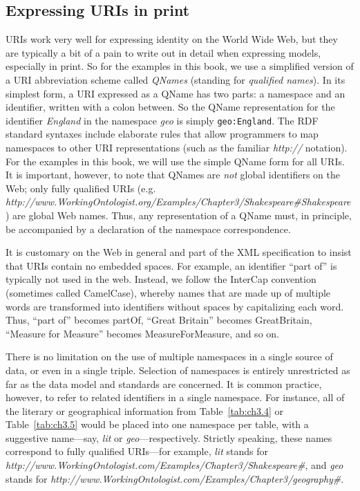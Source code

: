 \subsection{Expressing URIs in print}

URIs work very well for expressing identity on the World Wide Web, but
they are typically a bit of a pain to write out in detail when
expressing models, especially in print. So for the examples in this
book, we use a simplified version of a URI abbreviation scheme called
\emph{QNames} (standing for \emph{qualified names}). In its simplest form, a
URI expressed as a QName has two parts: a namespace and an identifier,
written with a colon between. So the QName representation for the
identifier \emph{England} in the namespace \emph{geo} is simply \texttt{geo:England}.
The RDF standard syntaxes include elaborate rules that allow programmers
to map namespaces to other URI representations (such as the familiar
\emph{http://} notation). For the examples in this book, we will use the
simple QName form for all URIs. It is important, however, to note that
QNames are \emph{not} global identifiers on the Web; only fully
qualified URIs (e.g.
\emph{http://www.WorkingOntologist.org/Examples/Chapter3/Shakespeare\#Shakespeare})
are global Web names. Thus, any representation of a QName must, in
principle, be accompanied by a declaration of the namespace
correspondence.

It is customary on the Web in general and part of the XML specification
to insist that URIs contain no embedded spaces. For example, an
identifier ``part of'' is typically not used in the web. Instead, we
follow the InterCap convention (sometimes called CamelCase), whereby
names that are made up of multiple words are transformed into
identifiers without spaces by capitalizing each word. Thus, ``part of''
becomes partOf, ``Great Britain'' becomes GreatBritain, ``Measure for
Measure'' becomes MeasureForMeasure, and so on.

There is no limitation on the use of multiple namespaces in a single
source of data, or even in
a single triple. Selection of namespaces is entirely unrestricted as far
as the data model and standards are concerned. It is common practice,
however, to refer to related identifiers in a single namespace. For
instance, all of the literary or geographical information from Table~\ref{tab:ch3.4}
or Table~\ref{tab:ch3.5} would be placed into one namespace per table, with a
suggestive name---say, \emph{lit} or \emph{geo}---respectively. Strictly
speaking, these names correspond to fully qualified URIs---for example,
\emph{lit} stands for \emph{http://www.WorkingOntologist.com/Examples/Chapter3/Shakespeare\#}, and
\emph{geo} stands for \emph{http://www.WorkingOntologist.com/Examples/Chapter3/geography\#}.


